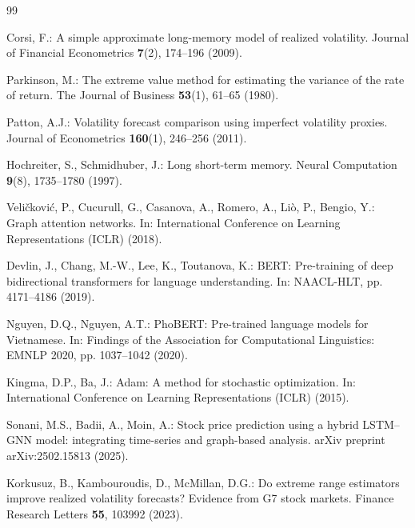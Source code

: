 \documentclass[runningheads]{llncs}
\begin{document}
%
%
\begin{thebibliography}{99}

Corsi, F.: A simple approximate long-memory model of realized volatility.
Journal of Financial Econometrics \textbf{7}(2), 174--196 (2009).

Parkinson, M.: The extreme value method for estimating the variance of the rate of return.
The Journal of Business \textbf{53}(1), 61--65 (1980).

Patton, A.J.: Volatility forecast comparison using imperfect volatility proxies.
Journal of Econometrics \textbf{160}(1), 246--256 (2011).

Hochreiter, S., Schmidhuber, J.: Long short-term memory.
Neural Computation \textbf{9}(8), 1735--1780 (1997).

Veli\v{c}kovi\'c, P., Cucurull, G., Casanova, A., Romero, A., Li\`o, P., Bengio, Y.:
Graph attention networks. In: International Conference on Learning Representations (ICLR) (2018).

Devlin, J., Chang, M.-W., Lee, K., Toutanova, K.: BERT: Pre-training of deep bidirectional
transformers for language understanding. In: NAACL-HLT, pp. 4171--4186 (2019).

Nguyen, D.Q., Nguyen, A.T.: PhoBERT: Pre-trained language models for Vietnamese.
In: Findings of the Association for Computational Linguistics: EMNLP 2020, pp. 1037--1042 (2020).

Kingma, D.P., Ba, J.: Adam: A method for stochastic optimization.
In: International Conference on Learning Representations (ICLR) (2015).

Sonani, M.S., Badii, A., Moin, A.: Stock price prediction using a hybrid LSTM--GNN model:
integrating time-series and graph-based analysis. arXiv preprint arXiv:2502.15813 (2025).

Korkusuz, B., Kambouroudis, D., McMillan, D.G.: Do extreme range estimators improve realized
volatility forecasts? Evidence from G7 stock markets.
Finance Research Letters \textbf{55}, 103992 (2023).


\end{thebibliography}
\end{document}
